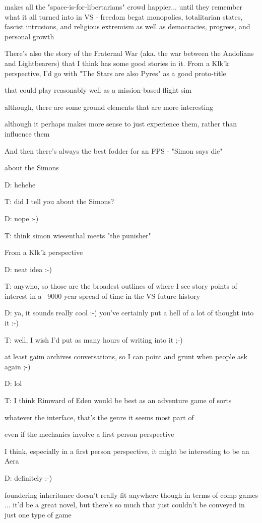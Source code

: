 makes all the "space-is-for-libertarians" crowd happier... until they remember what it all turned into in VS - freedom begat monopolies, totalitarian states, fascist intrusions, and religious extremism as well as democracies, progress, and personal growth

There's also the story of the Fraternal War (aka. the war between the Andolians and Lightbearers) that I think has some good stories in it. From a Klk'k perspective, I'd go with "The Stars are also Pyres" as a good proto-title

that could play reasonably well as a mission-based flight sim

although, there are some ground elements that are more interesting

although it perhaps makes more sense to just experience them, rather than influence them

And then there's always the best fodder for an FPS - "Simon says die"

about the Simons

D: hehehe

T: did I tell you about the Simons?

D: nope :-)

T: think simon wiesenthal meets "the punisher"

From a Klk'k perspective

D: neat idea :-)

T: anywho, so those are the broadest outlines of where I see story points of interest in a ~9000 year spread of time in the VS future history

D: ya, it sounds really cool :-) you've certainly put a hell of a lot of thought into it :-)

T: well, I wish I'd put as many hours of writing into it ;-)

at least gaim archives conversations, so I can point and grunt when people ask again ;-)

D: lol

T: I think Rimward of Eden would be best as an adventure game of sorts

whatever the interface, that's the genre it seems most part of

even if the mechanics involve a first person perspective

I think, especially in a first person perspective, it might be interesting to be an Aera

D: definitely :-)

foundering inheritance doesn't really fit anywhere though in terms of comp games ... it'd be a great novel, but there's so much that just couldn't be conveyed in just one type of game

